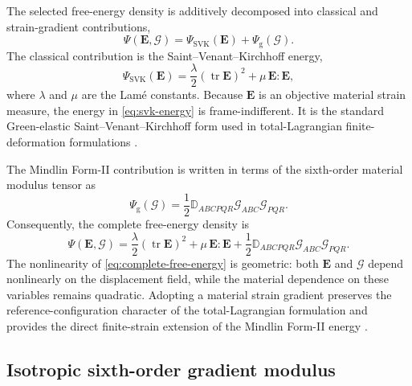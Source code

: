 \documentclass[preprint,12pt]{elsarticle}
\DeclareMathOperator{\tr}{tr}
\begin{document}
The selected free-energy density is additively decomposed into classical
and strain-gradient contributions,
\begin{equation}
 \Psi(\mathbf{E},\bm{\mathcal{G}})
 =\Psi_{\mathrm{SVK}}(\mathbf{E})
 +\Psi_{\mathrm{g}}(\bm{\mathcal{G}}).
 \label{eq:energy-decomposition}
\end{equation}
The classical contribution is the Saint--Venant--Kirchhoff energy,
\begin{equation}
 \Psi_{\mathrm{SVK}}(\mathbf{E})
 =\frac{\lambda}{2}\left(\tr\mathbf{E}\right)^2
 +\mu\,\mathbf{E}:\mathbf{E},
 \label{eq:svk-energy}
\end{equation}
where $\lambda$ and $\mu$ are the Lam\'e constants. Because
$\mathbf{E}$ is an objective material strain measure, the energy in
\eqref{eq:svk-energy} is frame-indifferent. It is the standard
Green-elastic Saint--Venant--Kirchhoff form used in total-Lagrangian
finite-deformation formulations \cite{Holzapfel2000,Ogden1997,BonetWood2008}.

The Mindlin Form-II contribution is written in terms of the sixth-order
material modulus tensor as
\begin{equation}
 \Psi_{\mathrm{g}}(\bm{\mathcal{G}})
 =\frac{1}{2}\mathbb{D}_{ABCPQR}
 \mathcal{G}_{ABC}\mathcal{G}_{PQR}.
 \label{eq:gradient-energy}
\end{equation}
Consequently, the complete free-energy density is
\begin{equation}
 \Psi(\mathbf{E},\bm{\mathcal{G}})
 =
 \frac{\lambda}{2}\left(\tr\mathbf{E}\right)^2
 +\mu\,\mathbf{E}:\mathbf{E}
 +\frac{1}{2}\mathbb{D}_{ABCPQR}
 \mathcal{G}_{ABC}\mathcal{G}_{PQR}.
 \label{eq:complete-free-energy}
\end{equation}
The nonlinearity of \eqref{eq:complete-free-energy} is geometric: both
$\mathbf{E}$ and $\bm{\mathcal{G}}$ depend nonlinearly on the
displacement field, while the material dependence on these variables remains
quadratic. Adopting a material strain gradient preserves the
reference-configuration character of the total-Lagrangian formulation and
provides the direct finite-strain extension of the Mindlin Form-II energy
\cite{MindlinEshel1968,AbaliMullerEremeyev2015}.

\subsection{Isotropic sixth-order gradient modulus}
\label{sec:isotropic-gradient-modulus}
\end{document}
